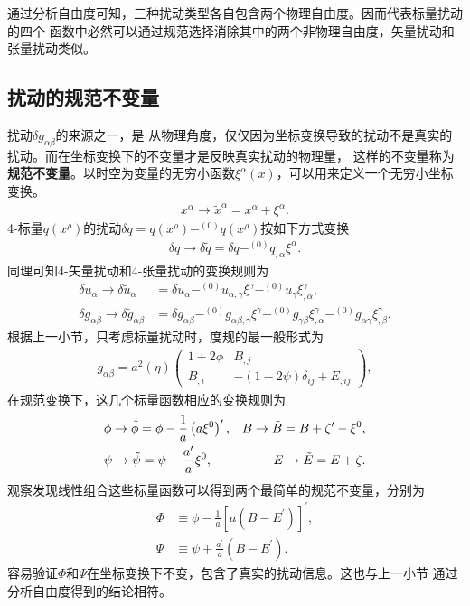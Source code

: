 通过分析自由度可知，三种扰动类型各自包含两个物理自由度。因而代表标量扰动的四个
函数中必然可以通过规范选择消除其中的两个非物理自由度，矢量扰动和张量扰动类似。

\subsection{扰动的规范不变量}


扰动$\delta g_{\alpha\beta}$的来源之一，是
从物理角度，仅仅因为坐标变换导致的扰动不是真实的扰动。而在坐标变换下的不变量才是反映真实扰动的物理量，
这样的不变量称为\textbf{规范不变量}。以时空为变量的无穷小函数$\xi^{\alpha}(x)$，可以用来定义一个无穷小坐标变换。
\begin{align}
	\label{eq:coordinate-transformation}
	x^{\alpha} \rightarrow \tilde{x}^{\alpha}=x^{\alpha}+\xi^{\alpha}.
\end{align}
4-标量$q(x^{\rho})$的扰动$\delta
	q=q(x^{\rho})-^{(0)}q(x^{\rho})$按如下方式变换
\begin{align}
	\label{eq:scalar-perturbation-transformation}
	\delta q \rightarrow \delta\tilde{q}=\delta q
	-^{(0)}q_{,\alpha}\xi^{\alpha}.
\end{align}
同理可知4-矢量扰动和4-张量扰动的变换规则为
\begin{align}
	\label{eq:vector-perturbation-transformation}
	\delta u_{\alpha} \rightarrow \delta\tilde{u}_{\alpha}          & =
	\delta
	u_{\alpha}-^{(0)}u_{\alpha,\gamma}\xi^{\gamma}-^{(0)}u_{\gamma}\xi^{\gamma}_{,\alpha},
	\\
	\label{eq:tensor-perturbation-transformation}
	\delta g_{\alpha\beta}\rightarrow\delta \tilde{g}_{\alpha\beta} & =
	\delta g_{\alpha\beta}-^{(0)}g_{\alpha\beta,\gamma}\xi^{\gamma}
	-^{(0)}g_{\gamma\beta}\xi^{\gamma}_{,\alpha}-^{(0)}g_{\alpha\gamma}\xi^{\gamma}_{,\beta}.
\end{align}
根据上一小节，只考虑标量扰动时，度规的最一般形式为
\begin{align}
	\label{eq:scalar-metric-perturbation}
	g_{\alpha\beta}=a^2(\eta)
	\begin{pmatrix}
		1 + 2\phi & B_{,j}                        \\
		B_{,i}    & -(1-2\psi)\delta_{ij}+E_{,ij}
	\end{pmatrix},
\end{align}
在规范变换下，这几个标量函数相应的变换规则为
\begin{align}
  \label{eq:transformation-for-scalar-perturbation-functions}
  &\phi \rightarrow
  \tilde{\phi}=\phi-\frac{1}{a}\left(a\xi^{0}\right)^{\prime},
  & B \rightarrow \tilde{B}=B+\zeta^\prime-\xi^{0}, \\
  &\psi\rightarrow \tilde{\psi}=\psi + \frac{a^\prime}{a}\xi^{0},
  & E \rightarrow \tilde{E}=E+\zeta.
\end{align}
观察发现线性组合这些标量函数可以得到两个最简单的规范不变量，分别为
\begin{align}
	\label{eq:gauge-invariant-scalar}
	\Phi & \equiv \phi
    -\frac{1}{a}{[a{\left(B-E^{\prime}\right)}]}^{\prime}, \\
	\Psi & \equiv \psi + \frac{a^{\prime}}{a}{\left(B-E^{\prime}\right)}.
\end{align}
容易验证$\Phi$和$\Psi$在坐标变换下不变，包含了真实的扰动信息。这也与上一小节
通过分析自由度得到的结论相符。

